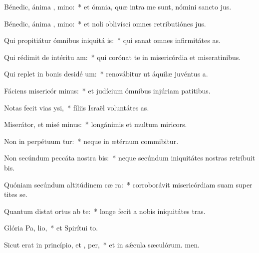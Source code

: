 \item Bénedic, ánima , mino:~* et ómnia, quæ intra me sunt, nómini sancto jus.
\item Bénedic, ánima , mino:~* et noli oblivísci omnes retributiónes jus.
\item Qui propitiátur ómnibus iniquitá is:~* qui sanat omnes infirmitátes as.
\item Qui rédimit de intéritu  am:~* qui corónat te in misericórdia et miseratinibus.
\item Qui replet in bonis desidé um:~* renovábitur ut áquilæ juvéntus a.
\item Fáciens misericór minus:~* et judícium ómnibus injúriam patitibus.
\item Notas fecit vias  ysi,~* fíliis Israël voluntátes as.
\item Miserátor, et misé minus:~* longánimis et multum miricors.
\item Non in perpétuum tur:~* neque in ætérnum commibitur.
\item Non secúndum peccáta nostra  bis:~* neque secúndum iniquitátes nostras retríbuit bis.
\item Quóniam secúndum altitúdinem cæ  ra:~* corroborávit misericórdiam suam super tites se.
\item Quantum distat ortus ab te:~* longe fecit a nobis iniquitátes tras.
\item Glória Pa,  lio,~* et Spirítui to.
\item Sicut erat in princípio, et ,  per,~* et in sǽcula sæculórum. men.
